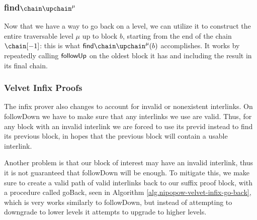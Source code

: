 


\subsubsection{find$\chain\upchain^\mu$}
Now that we have a way to go back on a level, we can utilize it to construct the entire traversable level $\mu$ up to block $b$, starting from the end of the chain $\chain[-1]$: this is what ${\sf find \chain\upchain^\mu}(b)$ accomplishes. It works by repeatedly calling $\sf followUp$ on the oldest block it has and including the result in its final chain.



\subsubsection{Velvet Infix Proofs}

The infix prover also changes to account for invalid or nonexistent interlinks. On \textsf{followDown} we have to make sure that any interlinks we use are valid. Thus, for any block with an invalid interlink we are forced to use its \textsf{previd} instead to find its previous block, in hopes that the previous block will contain a usable interlink.

Another problem is that our block of interest may have an invalid interlink, thus it is not guaranteed that \textsf{followDown} will be enough. To mitigate this, we make sure to create a valid path of valid interlinks back to our suffix proof block, with a procedure called \textsf{goBack}, seen in Algorithm \ref{alg.nipopow-velvet-infix-go-back}, which is very works similarly to \textsf{followDown}, but instead of attempting to downgrade to lower levels it attempts to upgrade to higher levels.


